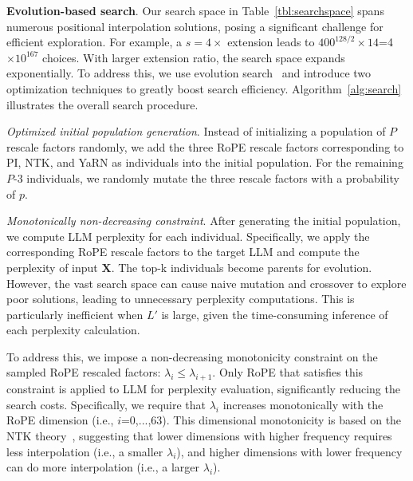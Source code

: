 \documentclass{article}
\theoremstyle{plain}
\theoremstyle{definition}
\theoremstyle{remark}
\begin{document}
\noindent\textbf{Evolution-based search}. Our search space in Table~\ref{tbl:searchspace} spans numerous positional interpolation solutions, posing a significant challenge for efficient exploration.  For example, a $s=4\times$ extension leads to  $400^{128/2}\times14$=4$\times10^{167}$ choices. With larger extension ratio,  the search space  expands exponentially.  
To address this, we use evolution search~\cite{guo2020single}  and introduce  two optimization techniques to greatly boost search efficiency. Algorithm~\ref{alg:search} illustrates the overall search procedure. 

	
\noindent\textit{Optimized initial population generation}. Instead of initializing a population  of $P$ rescale factors randomly, we add the three RoPE rescale factors corresponding to PI, NTK, and YaRN as individuals into the initial population. For the remaining $P$-3 individuals, we randomly mutate the three rescale factors with a probability of $p$. 



\noindent\textit{Monotonically non-decreasing constraint}. 
After generating the initial population, we compute LLM perplexity for each individual. Specifically, we apply the corresponding RoPE rescale factors to the target LLM and compute the perplexity of  input $\mathbf{X}$. The top-k individuals become parents for evolution. However, the vast search space can cause naive mutation and crossover to explore poor solutions, leading to unnecessary perplexity computations. This is particularly inefficient when $L'$ is large, given the time-consuming inference  of each perplexity calculation.

To address this, we impose a non-decreasing monotonicity constraint on the sampled RoPE rescaled factors: $\lambda_i\le \lambda_{i+1}$.
Only RoPE that satisfies this constraint is applied to LLM for perplexity evaluation, significantly reducing the search costs. Specifically,   we require that $\lambda_i$ increases monotonically with the RoPE dimension (i.e., $i$=0,...,63). This dimensional monotonicity is based on the NTK theory~\cite{jacot2018neural,tancik2020fourier,ntk}, suggesting that lower dimensions with higher frequency requires less interpolation (i.e., a smaller $\lambda_i$), and higher dimensions with lower frequency can do more interpolation (i.e.,  a larger $\lambda_i$).    
\end{document}
